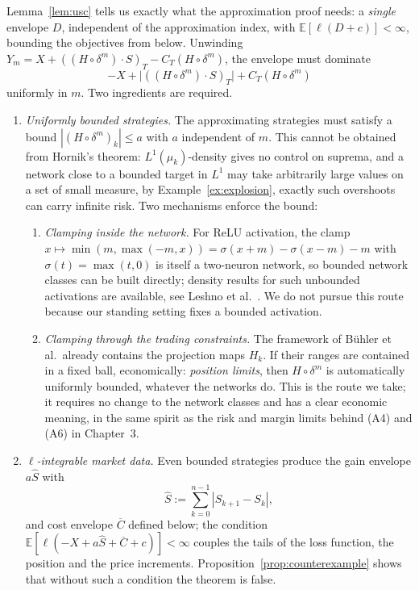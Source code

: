 \documentclass[11pt,a4paper]{report}
\numberwithin{equation}{chapter}
\theoremstyle{plain}
\theoremstyle{definition}
\newcommand{\E}{\mathbb{E}}
\begin{document}
Lemma~\ref{lem:usc} tells us exactly what the approximation proof needs: a \emph{single} envelope $D$, independent of the approximation index, with $\E[\ell(D+c)]<\infty$, bounding the objectives from below. Unwinding $Y_m=X+((H\circ\delta^m)\cdot S)_T-C_T(H\circ\delta^m)$, the envelope must dominate
\[
    -X+\bigl|((H\circ\delta^m)\cdot S)_T\bigr|+C_T(H\circ\delta^m)
\]
uniformly in $m$. Two ingredients are required.

\begin{enumerate}[leftmargin=*,itemsep=1ex,parsep=0pt]
    \item \emph{Uniformly bounded strategies.} The approximating strategies must satisfy a bound $|(H\circ\delta^m)_k|\le a$ with $a$ independent of $m$. This cannot be obtained from Hornik's theorem: $L^1(\mu_k)$-density gives no control on suprema, and a network close to a bounded target in $L^1$ may take arbitrarily large values on a set of small measure, by Example~\ref{ex:explosion}, exactly such overshoots can carry infinite risk. Two mechanisms enforce the bound:
          \begin{enumerate}[leftmargin=2em,itemsep=0pt,parsep=0pt]
              \item[\textup{(a)}] \emph{Clamping inside the network.} For ReLU activation, the clamp $x\mapsto\min(m,\max(-m,x))=\sigma(x+m)-\sigma(x-m)-m$ with $\sigma(t)=\max(t,0)$ is itself a two-neuron network, so bounded network classes can be built directly; density results for such unbounded activations are available, see Leshno et al.\ \cite{leshno}. We do not pursue this route because our standing setting fixes a bounded activation.
              \item[\textup{(b)}] \emph{Clamping through the trading constraints.} The framework of B\"uhler et al.\ already contains the projection maps $H_k$. If their ranges are contained in a fixed ball, economically: \emph{position limits}, then $H\circ\delta^m$ is automatically uniformly bounded, whatever the networks do. This is the route we take; it requires no change to the network classes and has a clear economic meaning, in the same spirit as the risk and margin limits behind (A4) and (A6) in Chapter~3.
          \end{enumerate}
    \item \emph{$\ell$-integrable market data.} Even bounded strategies produce the gain envelope $a\widehat S$ with
          \[
              \widehat S:=\sum_{k=0}^{n-1}|S_{k+1}-S_k|,
          \]
          and cost envelope $\overline C$ defined below; the condition $\E[\ell(-X+a\widehat S+\overline C+c)]<\infty$ couples the tails of the loss function, the position and the price increments. Proposition~\ref{prop:counterexample} shows that without such a condition the theorem is false.
\end{enumerate}
\end{document}
